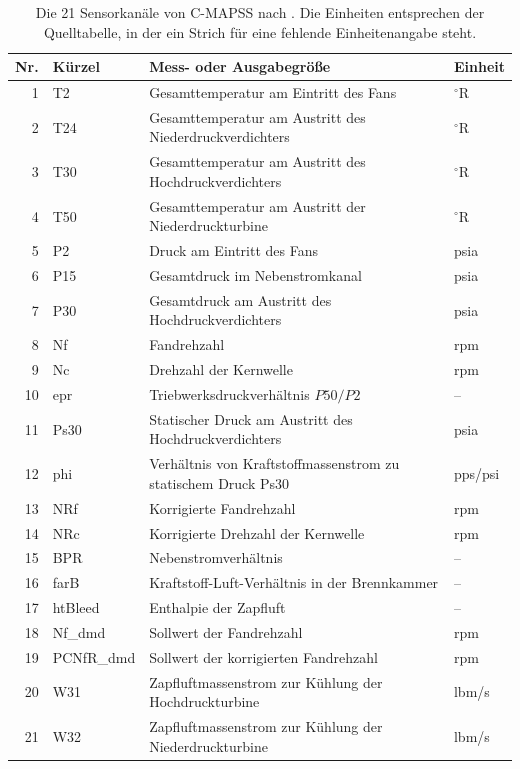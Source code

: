 \begin{table}[htbp]
    \centering
    \small
    \begin{tabularx}{\textwidth}{@{}r l >{\raggedright\arraybackslash}X l@{}}
        \toprule
        Nr. & Kürzel & Mess- oder Ausgabegröße & Einheit \\
        \midrule
        1 & T2 & Gesamttemperatur am Eintritt des Fans & $^\circ$R \\
        2 & T24 & Gesamttemperatur am Austritt des Niederdruckverdichters & $^\circ$R \\
        3 & T30 & Gesamttemperatur am Austritt des Hochdruckverdichters & $^\circ$R \\
        4 & T50 & Gesamttemperatur am Austritt der Niederdruckturbine & $^\circ$R \\
        5 & P2 & Druck am Eintritt des Fans & psia \\
        6 & P15 & Gesamtdruck im Nebenstromkanal & psia \\
        7 & P30 & Gesamtdruck am Austritt des Hochdruckverdichters & psia \\
        8 & Nf & Fandrehzahl & rpm \\
        9 & Nc & Drehzahl der Kernwelle & rpm \\
        10 & epr & Triebwerksdruckverhältnis $P50/P2$ & -- \\
        11 & Ps30 & Statischer Druck am Austritt des Hochdruckverdichters & psia \\
        12 & phi & Verhältnis von Kraftstoffmassenstrom zu statischem Druck Ps30 & pps/psi \\
        13 & NRf & Korrigierte Fandrehzahl & rpm \\
        14 & NRc & Korrigierte Drehzahl der Kernwelle & rpm \\
        15 & BPR & Nebenstromverhältnis & -- \\
        16 & farB & Kraftstoff-Luft-Verhältnis in der Brennkammer & -- \\
        17 & htBleed & Enthalpie der Zapfluft & -- \\
        18 & Nf\_dmd & Sollwert der Fandrehzahl & rpm \\
        19 & PCNfR\_dmd & Sollwert der korrigierten Fandrehzahl & rpm \\
        20 & W31 & Zapfluftmassenstrom zur Kühlung der Hochdruckturbine & lbm/s \\
        21 & W32 & Zapfluftmassenstrom zur Kühlung der Niederdruckturbine & lbm/s \\
        \bottomrule
    \end{tabularx}
    \caption{Die 21 Sensorkanäle von C-MAPSS nach \textcite[S.~3, Tab.~2]{saxenaDamagePropagationModeling}. Die Einheiten entsprechen der Quelltabelle, in der ein Strich für eine fehlende Einheitenangabe steht.}
    \label{tab:cmapss-sensorkanaele}
\end{table}

